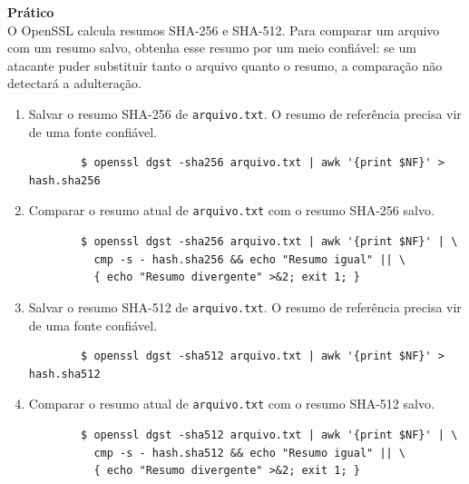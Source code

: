 \textbf{Prático}\\

O OpenSSL calcula resumos SHA-256 e SHA-512. Para comparar um arquivo com um resumo salvo, obtenha esse resumo por um meio confiável: se um atacante puder substituir tanto o arquivo quanto o resumo, a comparação não detectará a adulteração.

\begin{enumerate}
	\item Salvar o resumo SHA-256 de \texttt{arquivo.txt}. O resumo de referência precisa vir de uma fonte confiável.
	\begin{tcolorbox}[width=\textwidth]
	{\small
		\begin{verbatim}
		$ openssl dgst -sha256 arquivo.txt | awk '{print $NF}' > hash.sha256
		\end{verbatim}
	}
	\end{tcolorbox}

	\item Comparar o resumo atual de \texttt{arquivo.txt} com o resumo SHA-256 salvo.
	\begin{tcolorbox}[width=\textwidth]
	{\small
		\begin{verbatim}
		$ openssl dgst -sha256 arquivo.txt | awk '{print $NF}' | \
		  cmp -s - hash.sha256 && echo "Resumo igual" || \
		  { echo "Resumo divergente" >&2; exit 1; }
		\end{verbatim}
	}
	\end{tcolorbox}

	\item Salvar o resumo SHA-512 de \texttt{arquivo.txt}. O resumo de referência precisa vir de uma fonte confiável.
	\begin{tcolorbox}[width=\textwidth]
	{\small
		\begin{verbatim}
		$ openssl dgst -sha512 arquivo.txt | awk '{print $NF}' > hash.sha512
		\end{verbatim}
	}
	\end{tcolorbox}

	\item Comparar o resumo atual de \texttt{arquivo.txt} com o resumo SHA-512 salvo.
	\begin{tcolorbox}[width=\textwidth]
	{\small
		\begin{verbatim}
		$ openssl dgst -sha512 arquivo.txt | awk '{print $NF}' | \
		  cmp -s - hash.sha512 && echo "Resumo igual" || \
		  { echo "Resumo divergente" >&2; exit 1; }
		\end{verbatim}
	}
	\end{tcolorbox}
\end{enumerate}

\pagebreak

